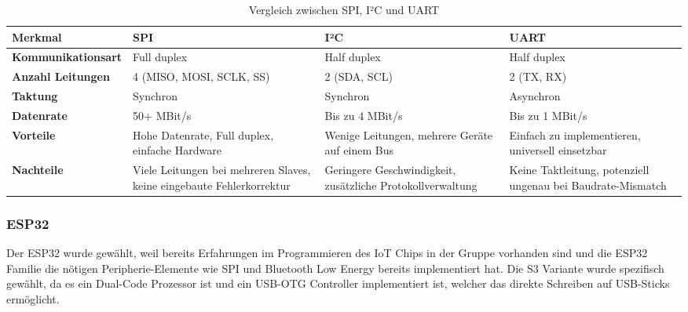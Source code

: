 \begin{table}[ht]
\renewcommand{\arraystretch}{1.5} %
\centering
\begin{tabular}{@{}p{3.4cm}p{3.2cm}p{3.2cm}p{3.2cm}@{}}
\toprule
\textbf{Merkmal}        & \textbf{SPI} & \textbf{I²C} & \textbf{UART} \\ \midrule
\textbf{Kommunikationsart} & Full duplex & Half duplex & Half duplex \\
\textbf{Anzahl Leitungen} & 4 (MISO, MOSI, SCLK, SS) & 2 (SDA, SCL) & 2 (TX, RX) \\
\textbf{Taktung}        & Synchron & Synchron & Asynchron \\
\textbf{Datenrate}      & 50+ MBit/s & Bis zu 4 MBit/s & Bis zu 1 MBit/s \\
\textbf{Vorteile}       & Hohe Datenrate, Full duplex, einfache Hardware & Wenige Leitungen, mehrere Geräte auf einem Bus & Einfach zu implementieren, universell einsetzbar \\
\textbf{Nachteile}      & Viele Leitungen bei mehreren Slaves, keine eingebaute Fehlerkorrektur & Geringere Geschwindigkeit, zusätzliche Protokollverwaltung & Keine Taktleitung, potenziell ungenau bei Baudrate-Mismatch \\
\bottomrule
\end{tabular}
\caption{Vergleich zwischen SPI, I²C und UART}
\label{tab:spi_vergleich}
\end{table}

\subsubsection{ESP32}
Der ESP32 wurde gewählt, weil bereits Erfahrungen im Programmieren des IoT Chips in der Gruppe vorhanden sind und die ESP32 Familie die nötigen Peripherie-Elemente wie SPI und Bluetooth Low Energy bereits implementiert hat. Die S3 Variante wurde spezifisch gewählt, da es ein Dual-Code Prozessor ist und ein USB-OTG Controller implementiert ist, welcher das direkte Schreiben auf USB-Sticks ermöglicht. 

